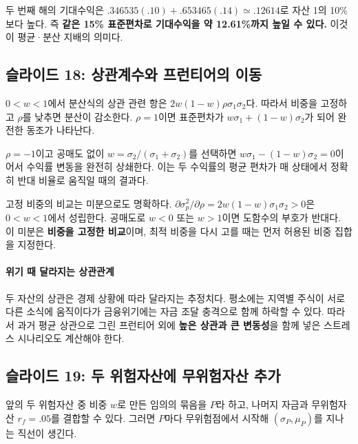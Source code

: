 \documentclass[11pt,a4paper]{article}
\begin{document}
두 번째 해의 기대수익은 $.346535(.10)+.653465(.14)\simeq.12614$로 자산 1의 10\%보다 높다. 즉 \textbf{같은 15\% 표준편차로 기대수익을 약 12.61\%까지 높일 수 있다.} 이것이 평균·분산 지배의 의미다.
\par

\subsection{슬라이드 18: 상관계수와 프런티어의 이동}

$0<w<1$에서 분산식의 상관 관련 항은 $2w(1-w)\rho\sigma_1\sigma_2$다. 따라서 비중을 고정하고 $\rho$를 낮추면 분산이 감소한다. $\rho=1$이면 표준편차가 $w\sigma_1+(1-w)\sigma_2$가 되어 완전한 동조가 나타난다.
\par

$\rho=-1$이고 공매도 없이 $w=\sigma_2/(\sigma_1+\sigma_2)$를 선택하면 $w\sigma_1-(1-w)\sigma_2=0$이어서 수익률 변동을 완전히 상쇄한다. 이는 두 수익률의 평균 편차가 매 상태에서 정확히 반대 비율로 움직일 때의 결과다.
\par

고정 비중의 비교는 미분으로도 명확하다. $\partial\sigma_p^2/\partial\rho=2w(1-w)\sigma_1\sigma_2>0$은 $0<w<1$에서 성립한다. 공매도로 $w<0$ 또는 $w>1$이면 도함수의 부호가 반대다. 이 미분은 \textbf{비중을 고정한 비교}이며, 최적 비중을 다시 고를 때는 먼저 허용된 비중 집합을 지정한다.
\par

\paragraph{위기 때 달라지는 상관관계}

두 자산의 상관은 경제 상황에 따라 달라지는 추정치다. 평소에는 지역별 주식이 서로 다른 소식에 움직이다가 금융위기에는 자금 조달 충격으로 함께 하락할 수 있다. 따라서 과거 평균 상관으로 그린 프런티어 외에 \textbf{높은 상관과 큰 변동성}을 함께 넣은 스트레스 시나리오도 계산해야 한다.
\par

\subsection{슬라이드 19: 두 위험자산에 무위험자산 추가}

앞의 두 위험자산 중 비중 $w$로 만든 임의의 묶음을 $P$라 하고, 나머지 자금과 무위험자산 $r_f=.05$를 결합할 수 있다. 그러면 $P$마다 무위험점에서 시작해 $(\sigma_P,\mu_P)$를 지나는 직선이 생긴다.
\par
\end{document}
